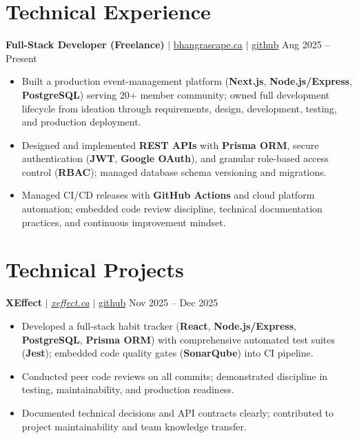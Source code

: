 \documentclass[11pt,a4paper]{article}
\begin{document}
\section{Technical Experience}

\textbf{Full-Stack Developer (Freelance)} $|$ \href{https://bhangrascape.ca}{bhangrascape.ca} $|$ \href{https://github.com/bhat0155/bhangraescape}{\small github} \hfill Aug 2025 -- Present
\begin{itemize}
    \item Built a production event-management platform (\textbf{Next.js}, \textbf{Node.js/Express}, \textbf{PostgreSQL}) serving 20+ member community; owned full development lifecycle from ideation through requirements, design, development, testing, and production deployment.
    \item Designed and implemented \textbf{REST APIs} with \textbf{Prisma ORM}, secure authentication (\textbf{JWT}, \textbf{Google OAuth}), and granular role-based access control (\textbf{RBAC}); managed database schema versioning and migrations.
    \item Managed CI/CD releases with \textbf{GitHub Actions} and cloud platform automation; embedded code review discipline, technical documentation practices, and continuous improvement mindset.
\end{itemize}

\section{Technical Projects}

\textbf{XEffect} $|$ \href{https://www.xeffect.ca/app}{\emph{xeffect.ca}} $|$ \href{https://github.com/bhat0155/xeffect}{\small github} \hfill Nov 2025 -- Dec 2025
\begin{itemize}
    \item Developed a full-stack habit tracker (\textbf{React}, \textbf{Node.js/Express}, \textbf{PostgreSQL}, \textbf{Prisma ORM}) with comprehensive automated test suites (\textbf{Jest}); embedded code quality gates (\textbf{SonarQube}) into CI pipeline.
    \item Conducted peer code reviews on all commits; demonstrated discipline in testing, maintainability, and production readiness.
    \item Documented technical decisions and API contracts clearly; contributed to project maintainability and team knowledge transfer.
\end{itemize}
\end{document}
